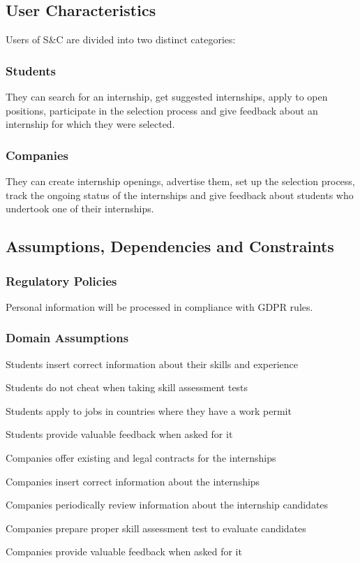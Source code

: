 \subsection{User Characteristics}
Users of S\&C are divided into two distinct categories:

\subsubsection{Students}
They can search for an internship, get suggested internships, apply to open positions, participate in the selection process and give feedback about an internship for which they were selected.
\subsubsection{Companies}
They can create internship openings, advertise them, set up the selection process, track the ongoing status of the internships and give feedback about students who undertook one of their internships.
\subsection{Assumptions, Dependencies and Constraints}

\subsubsection{Regulatory Policies}
Personal information will be processed in compliance with GDPR rules.
\subsubsection{Domain Assumptions}
\begin{enumerate}[label={[D\arabic*]}]
\item {Students insert correct information about their skills and experience}
\item {Students do not cheat when taking skill assessment tests}
\item {Students apply to jobs in countries where they have a work permit}
\item {Students provide valuable feedback when asked for it}
\item {Companies offer existing and legal contracts for the internships}
\item {Companies insert correct information about the internships}
\item {Companies periodically review information about the internship candidates}
\item {Companies prepare proper skill assessment test to evaluate candidates}
\item {Companies provide valuable feedback when asked for it}
\end{enumerate}